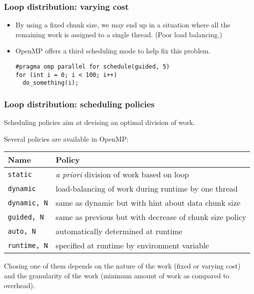 \begin{frame}[fragile]
  \frametitle{Loop distribution: varying cost}
  \begin{itemize}
  \item By using a fixed chunk size, we may end up in a situation where all the
    remaining work is assigned to a single thread. (Poor load balancing.)
  \item OpenMP offers a third scheduling mode to help fix this problem.
  \begin{lstlisting}[style=c]
#pragma omp parallel for schedule(guided, 5)
for (int i = 0; i < 100; i++)
  do_something(i);
  \end{lstlisting}
  \end{itemize}
\end{frame}


\begin{frame}
\frametitle{Loop distribution: scheduling policies}

Scheduling policies aim at devising an optimal division of work.

\bigskip

Several policies are available in OpenMP:\\[2ex]
\begin{tabular}{l|l}
\textbf{Name}  & \textbf{Policy}\\
\hline\hline
\texttt{static} & \textit{a priori} division of work based on loop\\
\texttt{dynamic} & load-balancing of work during runtime by one thread\\
\texttt{dynamic, N} & same as dynamic but with hint about data chunk size\\
\texttt{guided, N} & same as previous but with decrease of chunk size policy\\
\texttt{auto, N} & automatically determined at runtime\\
\texttt{runtime, N} & specified at runtime by environment variable\\
\end{tabular}

\bigskip
Chosing one of them depends on the nature of the work (fixed or varying cost) and the granularity of the work (minimum amount of work as compared to overhead).

\end{frame}

